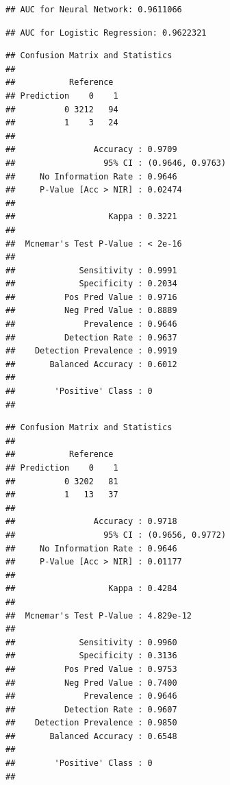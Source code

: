 \documentclass[
]{article}
\begin{document}
\begin{verbatim}
## AUC for Neural Network: 0.9611066
\end{verbatim}

\begin{verbatim}
## AUC for Logistic Regression: 0.9622321
\end{verbatim}

\begin{verbatim}
## Confusion Matrix and Statistics
## 
##           Reference
## Prediction    0    1
##          0 3212   94
##          1    3   24
##                                           
##                Accuracy : 0.9709          
##                  95% CI : (0.9646, 0.9763)
##     No Information Rate : 0.9646          
##     P-Value [Acc > NIR] : 0.02474         
##                                           
##                   Kappa : 0.3221          
##                                           
##  Mcnemar's Test P-Value : < 2e-16         
##                                           
##             Sensitivity : 0.9991          
##             Specificity : 0.2034          
##          Pos Pred Value : 0.9716          
##          Neg Pred Value : 0.8889          
##              Prevalence : 0.9646          
##          Detection Rate : 0.9637          
##    Detection Prevalence : 0.9919          
##       Balanced Accuracy : 0.6012          
##                                           
##        'Positive' Class : 0               
## 
\end{verbatim}

\begin{verbatim}
## Confusion Matrix and Statistics
## 
##           Reference
## Prediction    0    1
##          0 3202   81
##          1   13   37
##                                           
##                Accuracy : 0.9718          
##                  95% CI : (0.9656, 0.9772)
##     No Information Rate : 0.9646          
##     P-Value [Acc > NIR] : 0.01177         
##                                           
##                   Kappa : 0.4284          
##                                           
##  Mcnemar's Test P-Value : 4.829e-12       
##                                           
##             Sensitivity : 0.9960          
##             Specificity : 0.3136          
##          Pos Pred Value : 0.9753          
##          Neg Pred Value : 0.7400          
##              Prevalence : 0.9646          
##          Detection Rate : 0.9607          
##    Detection Prevalence : 0.9850          
##       Balanced Accuracy : 0.6548          
##                                           
##        'Positive' Class : 0               
## 
\end{verbatim}
\end{document}
